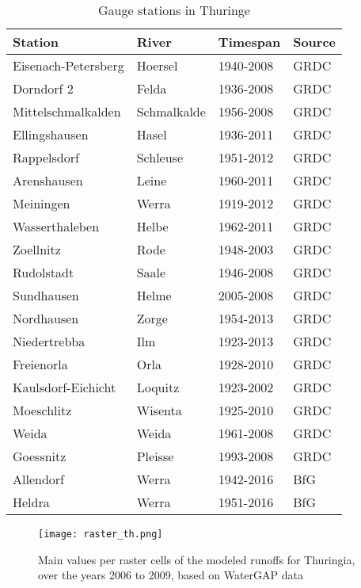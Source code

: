 \begin{table}[H]
\footnotesize
 \centering
 \caption{Gauge stations in Thuringe}
 \label{quelle_runoff_th}
 \begin{tabular}{|l|l|l|l|}
  \hline
  \textbf{Station}&\textbf{River}&\textbf{Timespan}&\textbf{Source}\\
  \hline
  Eisenach-Petersberg&Hoersel&1940-2008&GRDC\\
  Dorndorf 2&Felda&1936-2008&GRDC\\
  Mittelschmalkalden&Schmalkalde&1956-2008&GRDC\\
  Ellingshausen&Hasel&1936-2011&GRDC\\
  Rappelsdorf&Schleuse&1951-2012&GRDC\\
  Arenshausen&Leine&1960-2011&GRDC\\
  Meiningen&Werra&1919-2012&GRDC\\
  Wasserthaleben&Helbe&1962-2011&GRDC\\
  Zoellnitz&Rode&1948-2003&GRDC\\
  Rudolstadt&Saale&1946-2008&GRDC\\
  Sundhausen&Helme&2005-2008&GRDC\\
  Nordhausen&Zorge&1954-2013&GRDC\\
  Niedertrebba&Ilm&1923-2013&GRDC\\
  Freienorla&Orla&1928-2010&GRDC\\
  Kaulsdorf-Eichicht&Loquitz&1923-2002&GRDC\\
  Moeschlitz&Wisenta&1925-2010&GRDC\\
  Weida&Weida&1961-2008&GRDC\\
  Goessnitz&Pleisse&1993-2008&GRDC\\
  Allendorf&Werra&1942-2016&BfG\\
  Heldra&Werra&1951-2016&BfG\\
  \hline
 \end{tabular}
\end{table}



\begin{figure}[H]
\centering
\texttt{[image: raster\_th.png]}
\caption{Main values per raster cells of the modeled runoffs for Thuringia, over the years 2006 to 2009, based on WaterGAP data}
\label{raster_th}
\end{figure}